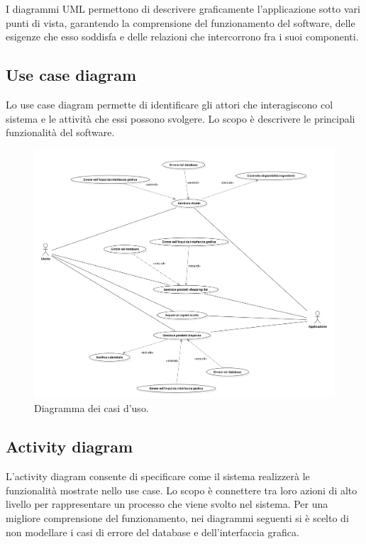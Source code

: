 \documentclass{article}
\begin{document}
I diagrammi UML permettono di descrivere graficamente l'applicazione sotto vari punti di vista, garantendo la comprensione del funzionamento del software, delle esigenze che esso soddisfa e delle relazioni che intercorrono fra i suoi componenti.

\subsection{Use case diagram}

Lo use case diagram permette di identificare gli attori che interagiscono col sistema e le attività che essi possono svolgere. Lo scopo è descrivere le principali funzionalità del software.

\begin{figure}[h!]
    \includegraphics[width=\linewidth]{images/use-case.png}
    \caption{Diagramma dei casi d'uso.}
    \label{fig:usecase}
\end{figure}

\subsection{Activity diagram}

L'activity diagram consente di specificare come il sistema realizzerà le funzionalità mostrate nello use case. Lo scopo è connettere tra loro azioni di alto livello per rappresentare un processo che viene svolto nel sistema. Per una migliore comprensione del funzionamento, nei diagrammi seguenti si è scelto di non modellare i casi di errore del database e dell'interfaccia grafica. 
\end{document}
